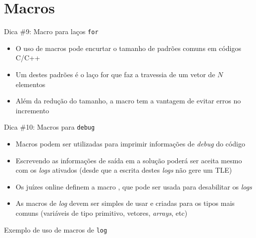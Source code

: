 \section{Macros}

\begin{frame}[fragile]{Dica \#9: Macro para laços \texttt{for}}

    \begin{itemize}
        \item O uso de macros pode encurtar o tamanho de padrões comuns em códigos C/C++

        \item Um destes padrões é o laço for que faz a travessia de um vetor de $N$ elementos

        \item Além da redução do tamanho, a macro tem a vantagem de evitar erros no incremento

    \end{itemize}

\end{frame}

\begin{frame}[fragile]{Dica \#10: Macros para \texttt{debug}}

    \begin{itemize}
        \item Macros podem ser utilizadas para imprimir informações de \textit{debug} do código

        \item Escrevendo as informações de saída em  a solução poderá ser
            aceita mesmo com os \textit{logs} ativados (desde que a escrita destes \textit{logs}
            não gere um TLE)

        \item Os juízes online definem a macro , que pode ser usada para
            desabilitar os \textit{logs}

        \item As macros de \textit{log} devem ser simples de usar e criadas para os tipos mais
            comuns (variáveis de tipo primitivo, vetores, \textit{arrays}, etc)
    \end{itemize}

\end{frame}

\begin{frame}[fragile]{Exemplo de uso de macros de \texttt{log}}
\end{frame}

